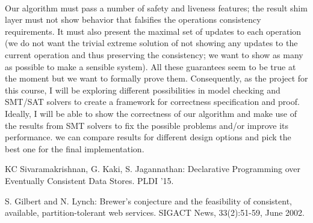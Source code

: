 \documentclass[runningheads,a4paper]{llncs}
\begin{document}
\paragraph{} Our algorithm must pass a number of safety and liveness features; the result shim layer must not show behavior that falsifies the operations consistency requirements. It must also present the maximal set of updates to each operation (we do not want the trivial extreme solution of not showing any updates to the current operation and thus preserving the consistency; we want to show as many as possible to make a sensible system). All these guarantees seem to be true at the moment but we want to formally prove them. Consequently, as the project for this course, I will be exploring different possibilities in model checking and SMT/SAT solvers to create a framework for correctness specification and proof. Ideally, I will be able to show the correctness of our algorithm and make use of the results from SMT solvers to fix the possible problems and/or improve its performance. we can compare results for different design options and pick the best one for the final implementation. 















\begin{thebibliography}{4}

 KC Sivaramakrishnan, G. Kaki, S. Jagannathan: Declarative Programming over
Eventually Consistent Data Stores. PLDI '15. 

 S. Gilbert and N. Lynch: Brewer's conjecture and the feasibility of
consistent, available, partition-tolerant web services. SIGACT News,
33(2):51-59, June 2002. 




\end{thebibliography}
\end{document}
